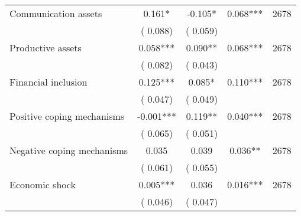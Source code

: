 \begin{tabular}{l*{4}{c}}
 Communication assets &              0.161* &        -0.105* &           0.068*** & 2678                       \\  
                 &        (       0.088)                   &        (       0.059)                        &                                                             &                                                      \\      

 Productive assets &              0.058*** &         0.090** &           0.068*** & 2678                       \\  
                 &        (       0.082)                   &        (       0.043)                        &                                                             &                                                      \\      

 Financial inclusion &              0.125*** &         0.085* &           0.110*** & 2678                       \\  
                 &        (       0.047)                   &        (       0.049)                        &                                                             &                                                      \\      

 Positive coping mechanisms &             -0.001*** &         0.119** &           0.040*** & 2678                       \\  
                 &        (       0.065)                   &        (       0.051)                        &                                                             &                                                      \\      

 Negative coping mechanisms &              0.035 &         0.039 &           0.036** & 2678                       \\  
                 &        (       0.061)                   &        (       0.055)                        &                                                             &                                                      \\      

 Economic shock &              0.005*** &         0.036 &           0.016*** & 2678                       \\  
                 &        (       0.046)                   &        (       0.047)                        &                                                             &                                                      \\      


\end{tabular}
